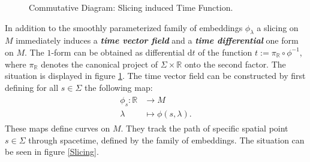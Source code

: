 \begin{figure}[hbt!]
\centering
{} 
\caption{Commutative Diagram: Slicing induced Time Function.}\label{DiagrTime}
\end{figure}

In addition to the smoothly parameterized family of embeddings $\phi_{\lambda}$ a slicing on $M$ immediately induces a \textit{\textbf{time vector field}} and a \textit{\textbf{time differential}} one form on $M$. The  $1$-form can be obtained as differential $\mathrm{d}t$ of the function $t:=\pi_{\mathbb{R}} \circ \phi^{-1}$, where $\pi_{\mathbb{R}}$ denotes the canonical project of $\Sigma \times \mathbb{R}$ onto the second factor. The situation is displayed in figure \ref{DiagrTime}.
The time vector field can be constructed by first defining for all $s \in \Sigma$ the following map: 
\begin{align}
\begin{aligned}
    \phi_s : \mathbb{R} &\longrightarrow M \\
    \lambda &\longmapsto \phi(s,\lambda).
\end{aligned}
\end{align}
These maps define curves on $M$. They track the path of specific spatial point $s \in \Sigma$ through spacetime, defined by the family of embeddings. The situation can be seen in figure \ref{Slicing}.

